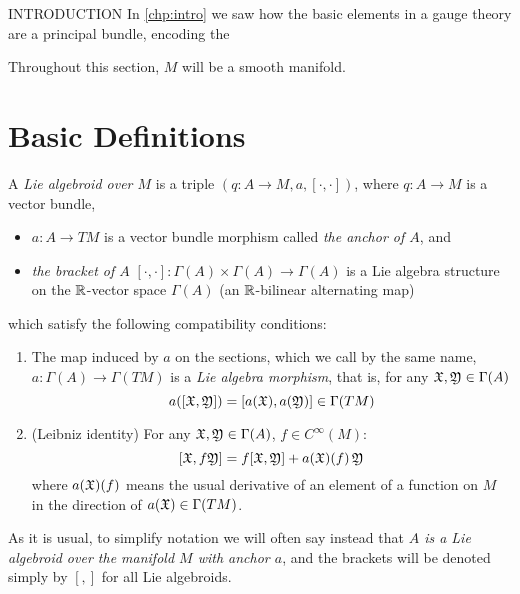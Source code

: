 INTRODUCTION  In \ref{chp:intro} we saw how the basic elements in a gauge theory are a principal bundle, encoding the 


Throughout this section, $M$ will be a smooth manifold.

\section{Basic Definitions}

\begin{definition} \label{defnLieAlgoid}
A \emph{Lie algebroid over $M$} is a triple $(q:A \to M, a, [\cdot, \cdot ])$, where $q:A \to M$ is a vector bundle, 
\begin{itemize}
    \item $a:A \to TM$ is a vector bundle morphism called \emph{the anchor of $A$}, and
    \item \emph{the bracket of $A$} $[\cdot, \cdot ]: \Gamma(A) \times \Gamma(A) \to \Gamma(A)$ is a Lie algebra structure on the $\operatorname{\mathbb{R}}$-vector space $\Gamma(A)$ (an $\operatorname{\mathbb{R}}$-bilinear alternating map) 
\end{itemize}  which satisfy the following compatibility conditions:

\begin{enumerate}
    \item The map induced by $a$ on the sections, which we call by the same name, $a:\Gamma(A) \to \Gamma(TM)$ is a \emph{Lie algebra morphism}, that is, for any $\mathfrak{X}, \mathfrak{Y} \in \Gamma(A)$ \[ a([\mathfrak{X}, \mathfrak{Y}])  = [a(\mathfrak{X}), a(\mathfrak{Y})] \in  \Gamma(TM)\]
    
    \item (Leibniz identity) For any $\mathfrak{X}, \mathfrak{Y} \in \Gamma(A)$, $f \in C^\infty (M)$: \[ [\mathfrak{X}, f\mathfrak{Y}] = f[\mathfrak{X}, \mathfrak{Y}] + a(\mathfrak{X})(f)\, \mathfrak{Y} \] where $a(\mathfrak{X})(f)$ means the usual derivative of an element of a function on $M$ in the direction of $a(\mathfrak{X}) \in \Gamma(TM)$.
\end{enumerate}
\end{definition}

As it is usual, to simplify notation we will often say instead that \emph{$A$ is a Lie algebroid over the manifold $M$ with anchor $a$}, and the brackets will be denoted simply by $[,]$ for all Lie algebroids.

